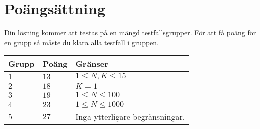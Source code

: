 \section*{Poängsättning}
Din lösning kommer att testas på en mängd testfallsgrupper.
För att få poäng för en grupp så måste du klara alla testfall i gruppen.

\noindent
\begin{tabular}{| l | l | p{12cm} |}
  \hline
  \textbf{Grupp} & \textbf{Poäng} & \textbf{Gränser} \\ \hline
  $1$    & $13$       & $1 \leq N, K \leq 15$ \\ \hline
  $2$    & $18$       & $K=1$ \\ \hline
  $3$    & $19$       & $1 \leq N \leq 100$ \\ \hline
  $4$    & $23$       & $1 \leq N \leq 1000$ \\ \hline
  $5$    & $27$       & Inga ytterligare begränsningar. \\ \hline
\end{tabular}
